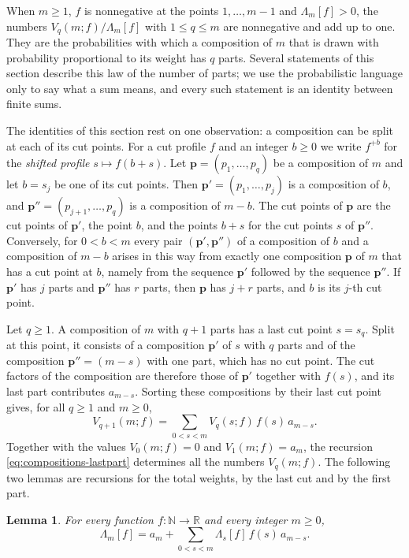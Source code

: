 \documentclass{amsart}
\newtheorem{lemma}[theorem]{Lemma}
\theoremstyle{definition}
\theoremstyle{remark}
\numberwithin{equation}{section}
\begin{document}
When $m\ge1$, $f$ is nonnegative at the points $1,\dots,m-1$ and
$\Lambda_m[f]>0$, the numbers
$V_q(m;f)/\Lambda_m[f]$ with $1\le q\le m$ are nonnegative and add up to
one. They are the probabilities with which a composition of $m$ that is
drawn with probability proportional to its weight has $q$ parts. Several
statements of this section describe this law of the number of parts; we use
the probabilistic language only to say what a sum means, and every such
statement is an identity between finite sums.

The identities of this section rest on one observation: a composition can be
split at each of its cut points. For a cut profile $f$ and an integer
$b\ge0$ we write $f^{+b}$ for the \emph{shifted profile} $s\mapsto f(b+s)$.
Let $\mathbf p=(p_1,\dots,p_q)$ be a composition of $m$ and let $b=s_j$ be one of its
cut points. Then $\mathbf p'=(p_1,\dots,p_j)$ is a composition of $b$, and
$\mathbf p''=(p_{j+1},\dots,p_q)$ is a composition of $m-b$. The cut points of $\mathbf p$
are the cut points of $\mathbf p'$, the point $b$, and the points $b+s$ for the cut
points $s$ of $\mathbf p''$.
Conversely, for $0<b<m$ every pair $(\mathbf p',\mathbf p'')$ of a composition of $b$ and a
composition of $m-b$ arises in this way from exactly one composition $\mathbf p$ of
$m$ that has a cut point at $b$, namely from the sequence $\mathbf p'$ followed by
the sequence $\mathbf p''$. If $\mathbf p'$ has $j$ parts and $\mathbf p''$ has $r$ parts, then $\mathbf p$
has $j+r$ parts, and $b$ is its $j$-th cut point.

Let $q\ge1$. A composition of $m$ with $q+1$ parts has a last cut point
$s=s_q$. Split at this point, it consists of a composition $\mathbf p'$ of $s$
with $q$ parts and of the composition $\mathbf p''=(m-s)$ with one part, which
has no cut point. The cut factors of the composition are therefore those of
$\mathbf p'$ together with $f(s)$, and its last part contributes $a_{m-s}$.
Sorting these compositions by their last cut point gives, for all $q\ge1$
and $m\ge0$,
\begin{equation}\label{eq:compositions-lastpart}
V_{q+1}(m;f)=\sum_{0<s<m}V_q(s;f)\,f(s)\,a_{m-s}.
\end{equation}
Together with the values $V_0(m;f)=0$ and
$V_1(m;f)=a_m$, the recursion \eqref{eq:compositions-lastpart} determines
all the numbers $V_q(m;f)$. The following two lemmas are recursions for the
total weights, by the last cut and by the first part.

\begin{lemma}\label{lem:lastcut}
For every function $f\colon\mathbb N\to\mathbb R$ and every integer $m\ge0$,
\[
\Lambda_m[f]=a_m+\sum_{0<s<m}\Lambda_s[f]\,f(s)\,a_{m-s}.
\]
\end{lemma}
\end{document}
